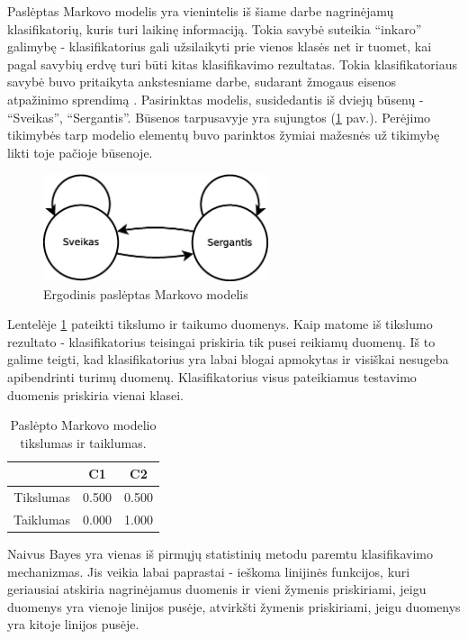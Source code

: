 \documentclass[]{vgtuef}
\begin{document}
Paslėptas Markovo modelis yra vienintelis iš šiame darbe nagrinėjamų klasifikatorių, kuris turi laikinę informaciją. Tokia savybė suteikia ``inkaro'' galimybę - klasifikatorius gali užsilaikyti prie vienos klasės net ir tuomet, kai pagal savybių erdvę turi būti kitas klasifikavimo rezultatas. Tokia klasifikatoriaus savybė buvo pritaikyta ankstesniame darbe, sudarant žmogaus eisenos atpažinimo sprendimą \cite{mano_darbas}. Pasirinktas modelis, susidedantis iš dviejų būsenų - ``Sveikas'', ``Sergantis''. Būsenos tarpusavyje yra sujungtos (\ref{fig:hmm_model} pav.). Perėjimo tikimybės tarp modelio elementų buvo parinktos žymiai mažesnės už tikimybę likti toje pačioje būsenoje.

\begin{figure}
	\centering
	\includegraphics[width=250px]{figures/hmm_modelis}
	\caption{Ergodinis paslėptas Markovo modelis}
	\label{fig:hmm_model}
\end{figure}

Lentelėje \ref{table:hmm_scores} pateikti tikslumo ir taikumo duomenys. Kaip matome iš tikslumo rezultato - klasifikatorius teisingai priskiria tik pusei reikiamų duomenų. Iš to galime teigti, kad klasifikatorius yra labai blogai apmokytas ir visiškai nesugeba apibendrinti turimų duomenų. Klasifikatorius visus pateikiamus testavimo duomenis priskiria vienai klasei.

\begin{table}[!t]
  \renewcommand{\arraystretch}{1.3}
  \centering
  \caption{Paslėpto Markovo modelio tikslumas ir taiklumas.}
  \label{table:hmm_scores}
  \begin{tabular}{|c|c|c|} \hline
    & C1 & C2 \\ \hline
    Tikslumas & 0.500 & 0.500 \\ \hline
    Taiklumas & 0.000 & 1.000 \\ \hline
  \end{tabular}
\end{table}

Naivus Bayes yra vienas iš pirmųjų statistinių metodu paremtu klasifikavimo mechanizmas. Jis veikia labai paprastai - ieškoma linijinės funkcijos, kuri geriausiai atskiria nagrinėjamus duomenis ir vieni žymenis priskiriami, jeigu duomenys yra vienoje linijos pusėje, atvirkšti žymenis priskiriami, jeigu duomenys yra kitoje linijos pusėje. 
\end{document}

